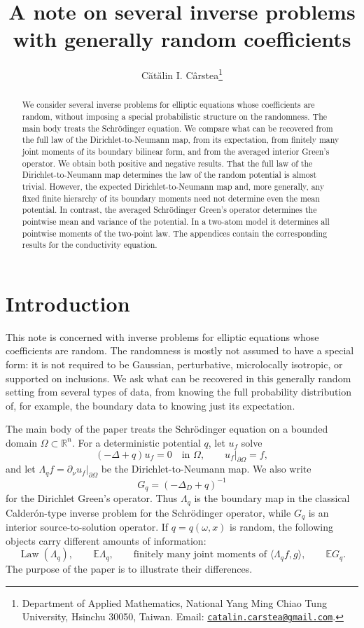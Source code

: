 \documentclass[11pt]{article}
\title{A note on several inverse problems with generally random coefficients}
\author{C\u{a}t\u{a}lin I. C\^{a}rstea\thanks{Department of Applied Mathematics, National Yang Ming Chiao Tung University, Hsinchu 30050, Taiwan. Email: \href{mailto:catalin.carstea@gmail.com}{\texttt{catalin.carstea@gmail.com}}.}}
\date{}
\newcommand{\OmegaD}{\Omega}
\newcommand{\R}{\mathbb R}
\newcommand{\E}{\mathbb E}
\newcommand{\Law}{\operatorname{Law}}
\newcommand{\la}{\langle}
\newcommand{\ra}{\rangle}
\theoremstyle{plain}
\theoremstyle{definition}
\theoremstyle{remark}
\begin{document}
\maketitle

\begin{abstract}
We consider several inverse problems for elliptic equations whose coefficients are random, without imposing a special probabilistic structure on the randomness.  The main body treats the Schr\"odinger equation.  We compare what can be recovered from the full law of the Dirichlet-to-Neumann map, from its expectation, from finitely many joint moments of its boundary bilinear form, and from the averaged interior Green's operator.  We obtain both positive and negative results.  That the full law of the Dirichlet-to-Neumann map determines the law of the random potential is almost trivial.  However, the expected Dirichlet-to-Neumann map and, more generally, any fixed finite hierarchy of its boundary moments need not determine even the mean potential.  In contrast, the averaged Schr\"odinger Green's operator determines the pointwise mean and variance of the potential.  In a two-atom model it determines all pointwise moments of the two-point law.    The appendices contain the corresponding results for the conductivity equation.
\end{abstract}


\section{Introduction}

This note is concerned with inverse problems for elliptic equations whose coefficients are random.  The randomness is mostly not assumed to have a special form: it is not required to be Gaussian, perturbative, microlocally isotropic, or supported on inclusions.  We ask what can be recovered in this generally random setting from several types of data, from knowing the full probability distribution of, for example, the boundary data to knowing just its expectation.

The main body of the paper treats the Schr\"odinger equation on a bounded domain $\OmegaD\subset\R^n$.  For a deterministic potential $q$, let $u_f$ solve
\[
  (-\Delta+q)u_f=0\quad\text{in }\OmegaD,
  \qquad u_f|_{\partial\OmegaD}=f,
\]
and let $\Lambda_q f=\partial_\nu u_f|_{\partial\OmegaD}$ be the Dirichlet-to-Neumann map.  We also write
\[
  G_q=(-\Delta_D+q)^{-1}
\]
for the Dirichlet Green's operator.  Thus $\Lambda_q$ is the boundary map in the classical Calder\'on-type inverse problem for the Schr\"odinger operator, while $G_q$ is an interior source-to-solution operator.  If $q=q(\omega,x)$ is random, the following objects carry different amounts of information:
\[
  \Law(\Lambda_q),\qquad
  \E\Lambda_q,
  \qquad
  \text{finitely many joint moments of }\la\Lambda_qf,g\ra,
  \qquad
  \E G_q.
\]
 The purpose of the paper is to illustrate their differences.
\end{document}
